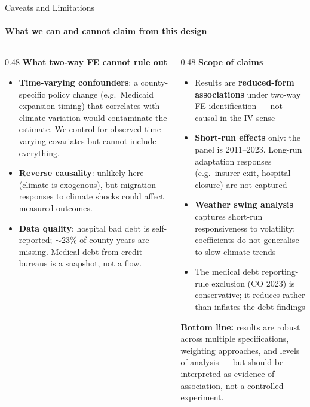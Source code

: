 \documentclass[aspectratio=169,11pt]{beamer}
\newcommand{\emphcolor}[1]{{\color{WarmOrange}\textbf{#1}}}
\newcommand{\tealtext}[1]{{\color{Teal}#1}}
\newcommand{\graytext}[1]{{\color{WarmGray}#1}}
\begin{document}
\begin{frame}[shrink=18]{Caveats and Limitations}
  \framesubtitle{What we can and cannot claim from this design}
  \begin{columns}[T]
    \begin{column}{0.48\textwidth}
      \textbf{\tealtext{What two-way FE cannot rule out}}\\[0.2em]
      \footnotesize
      \begin{itemize}\itemsep0.16em
        \item \emphcolor{Time-varying confounders}: a county-specific policy change (e.g.\ Medicaid expansion timing) that correlates with climate variation would contaminate the estimate. We control for observed time-varying covariates but cannot include everything.
        \item \emphcolor{Reverse causality}: unlikely here (climate is exogenous), but migration responses to climate shocks could affect measured outcomes.
        \item \emphcolor{Data quality}: hospital bad debt is self-reported; $\sim$23\% of county-years are missing. Medical debt from credit bureaus is a snapshot, not a flow.
      \end{itemize}
    \end{column}
    \begin{column}{0.48\textwidth}
      \textbf{\tealtext{Scope of claims}}\\[0.2em]
      \footnotesize
      \begin{itemize}\itemsep0.16em
        \item Results are \emphcolor{reduced-form associations} under two-way FE identification --- not causal in the IV sense
        \item \emphcolor{Short-run effects} only: the panel is 2011--2023. Long-run adaptation responses (e.g.\ insurer exit, hospital closure) are not captured
        \item \emphcolor{Weather swing analysis} captures short-run responsiveness to volatility; coefficients do not generalise to slow climate trends
        \item The medical debt reporting-rule exclusion (CO 2023) is conservative; it reduces rather than inflates the debt findings
      \end{itemize}
      \vspace{0.2em}
      \graytext{\scriptsize \textbf{Bottom line:} results are robust across multiple specifications, weighting approaches, and levels of analysis --- but should be interpreted as evidence of association, not a controlled experiment.}
    \end{column}
  \end{columns}
\end{frame}
\end{document}
